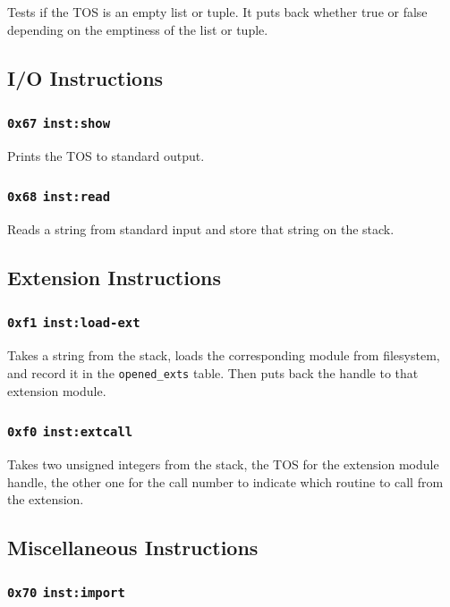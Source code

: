 \documentclass{article}
\newcommand{\inst}[1] {\texttt{inst:#1}}
\begin{document}
Tests if the TOS is an empty list or tuple. It puts back whether true or false depending on the emptiness of the list or tuple.

\subsection{I/O Instructions}

\subsubsection{\texttt{0x67} \inst{show}}

Prints the TOS to standard output.

\subsubsection{\texttt{0x68} \inst{read}}

Reads a string from standard input and store that string on the stack.

\subsection{Extension Instructions}

\subsubsection{\texttt{0xf1} \inst{load-ext}}

Takes a string from the stack, loads the corresponding module from filesystem, and record it in the \texttt{opened\_exts} table. Then puts back the handle to that extension module.

\subsubsection{\texttt{0xf0} \inst{extcall}}

Takes two unsigned integers from the stack, the TOS for the extension module handle, the other one for the call number to indicate which routine to call from the extension.

\subsection{Miscellaneous Instructions}

\subsubsection{\texttt{0x70} \inst{import}}
\end{document}
